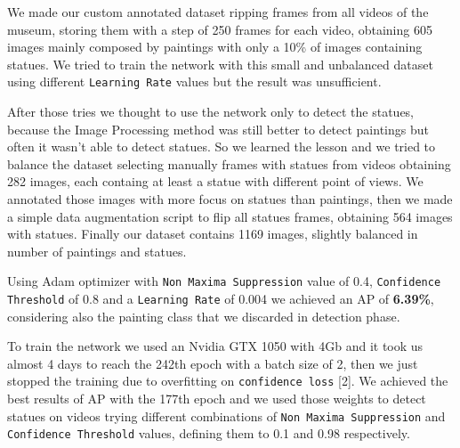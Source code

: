 \documentclass[10pt,twocolumn,letterpaper]{article}
\begin{document}
We made our custom annotated dataset ripping frames from all videos of the museum, storing
them with a step of 250 frames for each video, obtaining 605 images mainly composed by paintings 
with only a 10\% of images containing statues.
We tried to train the network with this small and unbalanced dataset using different {\tt Learning Rate} 
values but the result was unsufficient.

After those tries we thought to use the network only to detect the statues, because the Image Processing
method was still better to detect paintings but often it wasn't able to detect statues.
So we learned the lesson and we tried to balance the dataset selecting manually frames with statues
from videos obtaining 282 images, each containg at least a statue with different point of views.
We annotated those images with more focus on statues than paintings, then we made a simple data 
augmentation script to flip all statues frames, obtaining 564 images with statues.
Finally our dataset contains 1169 images, slightly balanced in number of paintings and statues.

Using Adam optimizer with {\tt Non Maxima Suppression} value of 0.4, {\tt Confidence Threshold} of 0.8 
and a {\tt Learning Rate} of 0.004 we achieved an AP of {\bf 6.39\%}, considering also the painting class that we 
discarded in detection phase. 

To train the network we used an Nvidia GTX 1050 with 4Gb and it took us almost 4 days to
reach the 242th epoch with a batch size of 2, then we just stopped the training due to overfitting on 
{\tt confidence loss} [2]. 
We achieved the best results of AP with the 177th epoch and we used those weights to detect
statues on videos trying different combinations of {\tt Non Maxima Suppression} and {\tt Confidence Threshold} values,
defining them to 0.1 and 0.98 respectively.
\end{document}
